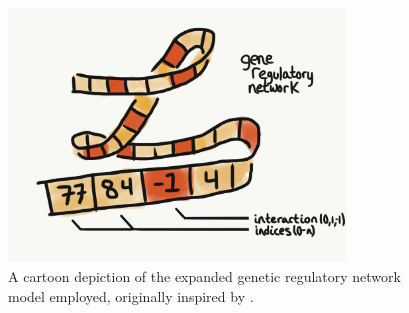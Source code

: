 \begin{figure}
    \centering
    \includegraphics[width=0.8\textwidth]{img/expanded_grn}
 	\captionsetup{singlelinecheck=off,justification=raggedright}
  	\caption{A cartoon depiction of the expanded genetic regulatory network model employed, originally inspired by \cite{Wilder2015ReconcilingEvolvability}.}
    \label{fig:expanded_grn}
\end{figure}